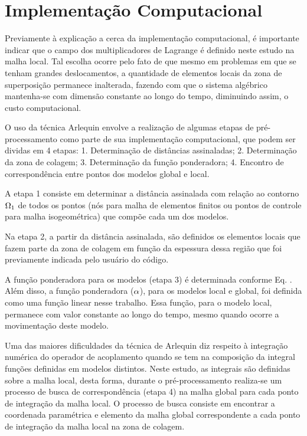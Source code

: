 \documentclass[tese_patricia]{subfiles}
\begin{document}
\section{Implementação Computacional}


Previamente à explicação a cerca da implementação computacional, é importante indicar que o campo dos multiplicadores de Lagrange é definido neste estudo na malha local. Tal escolha ocorre pelo fato de que mesmo em problemas em que se tenham grandes deslocamentos, a quantidade de elementos locais da zona de superposição permanece inalterada, fazendo com que o sistema algébrico mantenha-se com dimensão constante ao longo do tempo, diminuindo assim, o custo computacional.

O uso da técnica Arlequin envolve a realização de algumas etapas de pré-processamento como parte de sua implementação computacional, que podem ser dividas em 4 etapas: 1. Determinação de distâncias assinaladas; 2. Determinação da zona de colagem;  3. Determinação da função ponderadora; 4. Encontro de correspondência entre pontos dos modelos global e local.

A etapa 1 consiste em determinar a distância assinalada com relação ao contorno $\Omega_{1}$ de todos os pontos (nós para malha de elementos finitos ou pontos de controle para malha isogeométrica) que compõe cada um dos modelos.

Na etapa 2, a partir da distância assinalada, são definidos os elementos locais que fazem parte da zona de colagem em função da espessura dessa região que foi previamente indicada pelo usuário do código.

A função ponderadora para os modelos (etapa 3) é  determinada conforme Eq. . Além disso, a função ponderadora ($\alpha$), para os modelos local e global, foi definida como uma função linear nesse trabalho. Essa função, para o modelo local, permanece com valor constante ao longo do tempo, mesmo quando ocorre a movimentação deste modelo.

Uma das maiores dificuldades da técnica de Arlequin diz respeito à integração numérica do operador de acoplamento quando se tem na composição da integral funções definidas em modelos distintos. Neste estudo, as integrais são definidas sobre a malha local, desta forma, durante o pré-processamento realiza-se um processo de busca de correspondência (etapa 4) na malha global para cada ponto de integração da malha local. O processo de busca consiste em encontrar a coordenada paramétrica e elemento da malha global correspondente a cada ponto de integração da malha local na zona de colagem.
\end{document}
